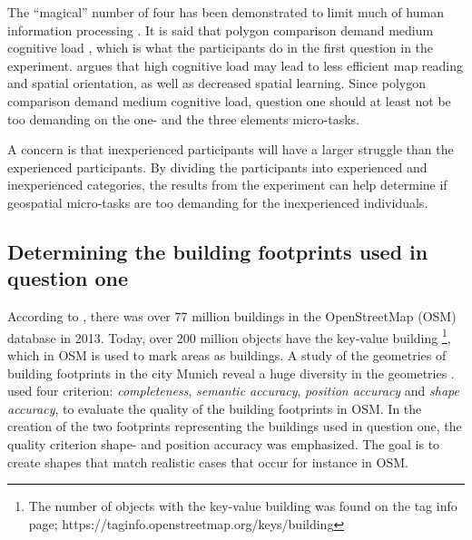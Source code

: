 The “magical” number of four has been demonstrated to limit much of human information processing \citep{Mandler2013}. It is said that polygon comparison demand medium cognitive load \citep{Kiefer2016}, which is what the participants do in the first question in the experiment. \cite{Kiefer2016} argues that high cognitive load may lead to less efficient map reading and spatial orientation, as well as decreased spatial learning. Since polygon comparison demand medium cognitive load, question one should at least not be too demanding on the one- and the three elements micro-tasks. 

A concern is that inexperienced participants will have a larger struggle than the experienced participants.  By dividing the participants into experienced and inexperienced categories, the results from the experiment can help determine if geospatial micro-tasks are too demanding for the inexperienced individuals. 

\subsection[Building shapes]{Determining the building footprints used in question one}


According to \cite{Fan2014}, there was over 77 million buildings in the OpenStreetMap (OSM) database in 2013. Today, over 200 million objects have the key-value building \footnote{The number of objects with the key-value building was found on the tag info page; https://taginfo.openstreetmap.org/keys/building}, which in OSM is used to mark areas as buildings. A study of the geometries of building footprints in the city Munich reveal a huge diversity in the geometries \citep{Fan2014}. \cite{Fan2014} used four criterion: \textit{completeness}, \textit{semantic accuracy}, \textit{position accuracy} and \textit{shape accuracy}, to evaluate the quality of the building footprints in OSM. In the creation of the two footprints representing the buildings used in question one, the quality criterion shape- and position accuracy was emphasized. The goal is to create shapes that match realistic cases that occur for instance in OSM. 

